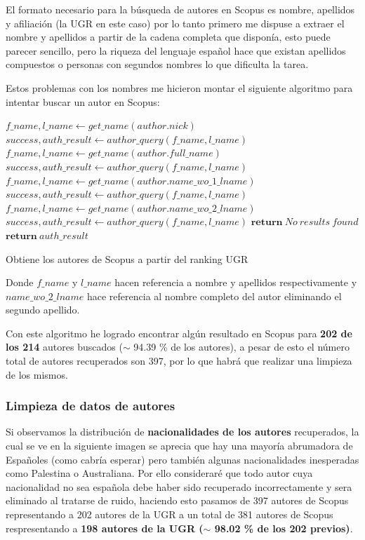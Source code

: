 El formato necesario para la búsqueda de autores en Scopus es nombre, apellidos y afiliación (la \acrshort{UGR} en este caso) por lo tanto primero me dispuse a extraer el nombre y apellidos a partir de la cadena completa que disponía, esto puede parecer sencillo, pero la riqueza del lenguaje español hace que existan apellidos compuestos o personas con segundos nombres lo que dificulta la tarea.

Estos problemas con los nombres me hicieron montar el siguiente algoritmo para intentar buscar un autor en Scopus:


\begin{algorithm}[h]
	\begin{algorithmic} 
		\State $f\_name, l\_name \gets get\_name(author.nick)$
		\State $success, auth\_result  \gets author\_query(f\_name, l\_name)$
		\State $f\_name, l\_name \gets get\_name(author.full\_name)$
		\State $success, auth\_result  \gets author\_query(f\_name, l\_name)$
		\State $f\_name, l\_name \gets get\_name(author.name\_wo\_1\_lname)$
		\State $success, auth\_result  \gets author\_query(f\_name, l\_name)$
		\State $f\_name, l\_name \gets get\_name(author.name\_wo\_2\_lname)$
		\State $success, auth\_result  \gets author\_query(f\_name, l\_name)$
		\State $\textbf{return}\ No\ results\ found$
		\EndIf
		\EndIf
		\EndIf
		\EndIf
		\State $\textbf{return}\ auth\_result$
	
		\EndFor
	\end{algorithmic}  
	\caption{Obtiene los autores de Scopus a partir del ranking UGR}	
\end{algorithm}


Donde $f\_name$ y $l\_name$ hacen referencia a nombre y apellidos respectivamente y $name\_wo\_2\_lname$ hace referencia al nombre completo del autor eliminando el segundo apellido.

Con este algoritmo he logrado encontrar algún resultado en Scopus para \textbf{202 de los 214} autores buscados ($\sim$ 94.39 \% de los autores), a pesar de esto el número total de autores recuperados son 397, por lo que habrá que realizar una limpieza de los mismos.

\subsubsection{Limpieza de datos de autores}
Si observamos la distribución de \textbf{nacionalidades de los autores} recuperados, la cual se ve en la siguiente imagen se aprecia que hay una mayoría abrumadora de Españoles (como cabría esperar) pero también algunas nacionalidades inesperadas como Palestina o Australiana. Por ello consideraré que todo autor cuya nacionalidad no sea española debe haber sido recuperado incorrectamente y sera eliminado al tratarse de ruido, haciendo esto pasamos de 397 autores de Scopus representando a 202 autores de la \acrshort{UGR} a un total de 381 autores de Scopus respresentando a \textbf{198 autores de la \acrshort{UGR} ($\sim$ 98.02 \% de los 202 previos)}.

